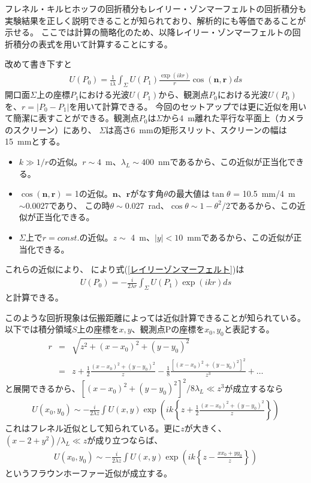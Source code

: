 \documentclass[a4paper,11pt,uplatex]{jsbook}
\begin{document}
フレネル・キルヒホッフの回折積分もレイリー・ゾンマーフェルトの回折積分も実験結果を正しく説明できることが知られており、解析的にも等価であることが示せる\cite{FToptics}。
ここでは計算の簡略化のため、以降レイリー・ゾンマーフェルトの回折積分の表式を用いて計算することにする。

改めて書き下すと
\begin{eqnarray}
  U(P_0) = \frac{1}{i\lambda}\int_{\Sigma} U(P_1)\frac{\exp(ikr)}{r}\cos(\bm{n},\bm{r})ds
\end{eqnarray}\label{レイリーゾンマーフェルト}
開口面$\Sigma$上の座標$P_1$における光波$U(P_1)$から、観測点$P_0$における光波$U(P_0)$を、$r = |P_0- P_1|$を用いて計算できる。
今回のセットアップでは更に近似を用いて簡潔に表すことができる。観測点$P_0$は$\Sigma$から4~m離れた平行な平面上（カメラのスクリーン）にあり、
$\Sigma$は高さ6~mmの矩形スリット、スクリーンの幅は15~mmとする。
\begin{itemize}
  \item $k \gg 1/r$の近似。$r\sim4$~m、$\lambda_L \sim 400$~nmであるから、この近似が正当化できる。
  \item $\cos(\bm{n},\bm{r})$ = 1の近似。$\bm{n}$、$\bm{r}$がなす角$\theta$の最大値は$\tan\theta$ = 10.5~mm/4~m $\sim 0.0027$であり、
  この時$\theta\sim 0.027$~rad、$\cos\theta \sim 1 - \theta^2/2$であるから、この近似が正当化できる。
  \item $\Sigma$上で$r = const.$の近似。$z\sim$ 4~m、$|y|<10$~mmであるから、この近似が正当化できる。
\end{itemize}
これらの近似により、
により式(\ref{レイリーゾンマーフェルト})は
\begin{eqnarray}
  U(P_0) = -\frac{i}{2\lambda r} \int_{\Sigma} U(P_1)\exp(ikr) ds
  \label{レイリーゾンマーフェルト近似}
\end{eqnarray}
と計算できる。

このような回折現象は伝搬距離によっては近似計算できることが知られている。以下では積分領域$S$上の座標を$x,y$、観測点Pの座標を$x_0,y_0$と表記する。
\begin{eqnarray}
  r &=& \sqrt{z^2 + (x-x_0)^2 + (y-y_0)^2}\\
  &=& z + \frac{1}{2}\frac{(x-x_0)^2 + (y-y_0)^2}{z} - \frac{1}{8}\frac{\left[(x-x_0)^2 + (y-y_0)^2\right]^2}{z^3} +\dots
\end{eqnarray}
と展開できるから、$\left[(x-x_0)^2 + (y-y_0)^2\right]^2/8\lambda_L \ll z^3$が成立するなら
\begin{eqnarray}
  U(x_0,y_0) \sim -\frac{i}{2\lambda z}\int U(x,y) \exp(ik\left\{z +\frac{1}{2}\frac{(x-x_0)^2 + (y-y_0)^2}{z}\right\})
\end{eqnarray}
これはフレネル近似として知られている。更に$z$が大きく、$(x-2 + y^2)/\lambda_L \ll z$が成り立つならば、
\begin{eqnarray}
  U(x_0,y_0) \sim -\frac{i}{2\lambda z}\int U(x,y) \exp(ik\left\{z -\frac{xx_0 + yy_0}{z}\right\})
\end{eqnarray}
というフラウンホーファー近似が成立する。
\end{document}
